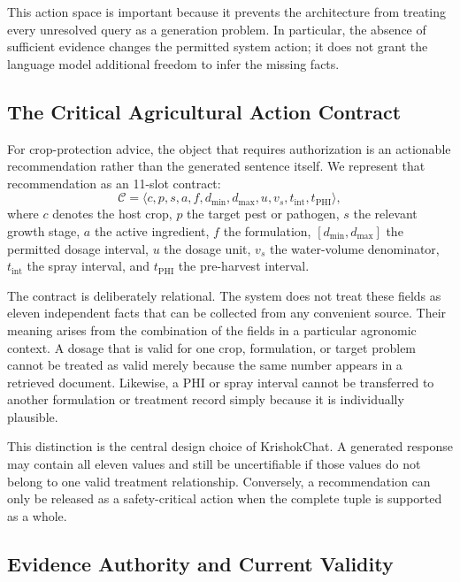 \documentclass[a4paper,fleqn]{cas-dc}
\begin{document}
This action space is important because it prevents the architecture from treating every unresolved query as a generation problem. In particular, the absence of sufficient evidence changes the permitted system action; it does not grant the language model additional freedom to infer the missing facts.

\subsection{The Critical Agricultural Action Contract}

For crop-protection advice, the object that requires authorization is an actionable recommendation rather than the generated sentence itself. We represent that recommendation as an 11-slot contract:
\begin{equation}
\mathcal{C} = \langle c, p, s, a, f, d_{\min}, d_{\max}, u, v_s, t_{\mathrm{int}}, t_{\mathrm{PHI}} \rangle,
\end{equation}
where $c$ denotes the host crop, $p$ the target pest or pathogen, $s$ the relevant growth stage, $a$ the active ingredient, $f$ the formulation, $[d_{\min}, d_{\max}]$ the permitted dosage interval, $u$ the dosage unit, $v_s$ the water-volume denominator, $t_{\mathrm{int}}$ the spray interval, and $t_{\mathrm{PHI}}$ the pre-harvest interval.

The contract is deliberately relational. The system does not treat these fields as eleven independent facts that can be collected from any convenient source. Their meaning arises from the combination of the fields in a particular agronomic context. A dosage that is valid for one crop, formulation, or target problem cannot be treated as valid merely because the same number appears in a retrieved document. Likewise, a PHI or spray interval cannot be transferred to another formulation or treatment record simply because it is individually plausible.

This distinction is the central design choice of KrishokChat. A generated response may contain all eleven values and still be uncertifiable if those values do not belong to one valid treatment relationship. Conversely, a recommendation can only be released as a safety-critical action when the complete tuple is supported as a whole.

\subsection{Evidence Authority and Current Validity}
\end{document}
